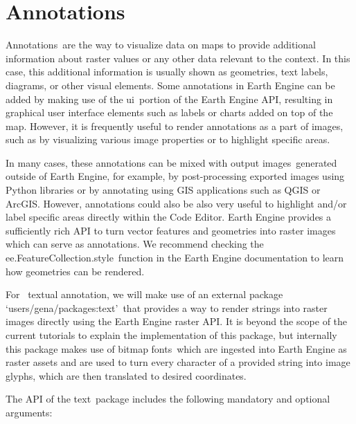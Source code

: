 \documentclass[
  letterpaper,
  DIV=11,
  numbers=noendperiod]{scrreprt}
\begin{document}
\hypertarget{annotations}{%
\section{Annotations}\label{annotations}}

Annotations~are the way to visualize data on maps to provide additional
information about raster values or any other data relevant to the
context. In this case, this additional information is usually shown as
geometries, text labels, diagrams, or other visual elements. Some
annotations in Earth Engine can be added by making use of the ui~portion
of the Earth Engine API, resulting in graphical user interface elements
such as labels or charts added on top of the map. However, it is
frequently useful to render annotations as a part of images, such as by
visualizing various image properties or to highlight specific areas.

In many cases, these annotations can be mixed with output
images~generated outside of Earth Engine, for example, by
post-processing exported images using Python libraries or by annotating
using GIS applications such as QGIS or ArcGIS. However, annotations
could also be also very useful to highlight and/or label specific areas
directly within the Code Editor. Earth Engine provides a sufficiently
rich API to turn vector features and geometries into raster images which
can serve as annotations. We recommend checking the
ee.FeatureCollection.style~function in the Earth Engine documentation to
learn how geometries can be rendered.

For~ textual annotation, we will make use of an external package
`users/gena/packages:text'~that provides a way to render strings into
raster images directly using the Earth Engine raster API. It is beyond
the scope of the current tutorials to explain the implementation of this
package, but internally this package makes use of bitmap fonts~which are
ingested into Earth Engine as raster assets and are used to turn every
character of a provided string into image glyphs, which are then
translated to desired coordinates.

The API of the text~package includes the following mandatory and
optional arguments:
\end{document}
